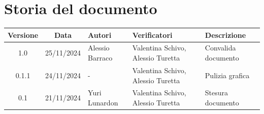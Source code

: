 \section*{Storia del documento}
\begin{tabularx}{\textwidth}{ c c p{3cm} p{3.17cm} X }
    \rowcolor{gray!20}\rule{0pt}{0.5cm}\textbf{Versione} & \textbf{Data} & \textbf{Autori} & \textbf{Verificatori} & \textbf{Descrizione} \\[0.7ex]
    \hline
    \rule{0pt}{0.5cm}1.0 & 25/11/2024 & Alessio Barraco & Valentina Schivo, \newline Alessio Turetta & Convalida documento\\[3.5ex]
    \hline
    \rule{0pt}{0.5cm}0.1.1 & 24/11/2024 & - & Valentina Schivo, \newline Alessio Turetta & Pulizia grafica\\[3.5ex]
    \hline
    \rule{0pt}{0.5cm}0.1 & 21/11/2024 & Yuri Lunardon & Valentina Schivo, \newline Alessio Turetta & Stesura documento\\[0.7ex] 
\end{tabularx}

